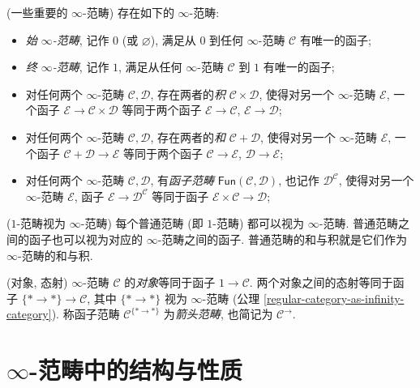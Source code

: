 \begin{axiom}
	{(一些重要的 $\infty$-范畴)}
	存在如下的 $\infty$-范畴:
	\begin{itemize}
		\item \emph{始 $\infty$-范畴}, 记作 $0$ (或 $\varnothing$), 满足从 $0$ 到任何 $\infty$-范畴 $\mathcal C$ 有唯一的函子;
		\item \emph{终 $\infty$-范畴}, 记作 $1$, 满足从任何 $\infty$-范畴 $\mathcal C$ 到 $1$ 有唯一的函子;
		\item 对任何两个 $\infty$-范畴 $\mathcal C,\mathcal D$, 存在两者的\emph{积} $\mathcal C\times \mathcal D$,
		使得对另一个 $\infty$-范畴 $\mathcal E$,
		一个函子 $\mathcal E\to\mathcal C\times\mathcal D$ 等同于两个函子 $\mathcal E\to\mathcal C$, $\mathcal E\to\mathcal D$;
		\item 对任何两个 $\infty$-范畴 $\mathcal C,\mathcal D$, 存在两者的\emph{和} $\mathcal C + \mathcal D$,
		使得对另一个 $\infty$-范畴 $\mathcal E$,
		一个函子 $\mathcal C + \mathcal D \to \mathcal E$ 等同于两个函子 $\mathcal C \to \mathcal E$, $\mathcal D \to \mathcal E$;
		\item 对任何两个 $\infty$-范畴 $\mathcal C,\mathcal D$, 有\emph{函子范畴} $\mathsf {Fun}(\mathcal C,\mathcal D)$,
		也记作 $\mathcal D^{\mathcal C}$, 使得对另一个 $\infty$-范畴 $\mathcal E$,
		函子 $\mathcal E\to \mathcal D^{\mathcal C}$ 等同于函子 $\mathcal E\times\mathcal C \to \mathcal D$;
	\end{itemize}
\end{axiom}

\begin{axiom}
	[label={regular-category-as-infinity-category}]
	{($1$-范畴视为 $\infty$-范畴)}
	每个普通范畴 (即 $1$-范畴) 都可以视为 $\infty$-范畴. 普通范畴之间的函子也可以视为对应的 $\infty$-范畴之间的函子.
	普通范畴的和与积就是它们作为 $\infty$-范畴的和与积.
\end{axiom}

\begin{axiom}
	{(对象, 态射)}
	$\infty$-范畴 $\mathcal C$ 的\emph{对象}等同于函子 $1\to \mathcal C$.
	两个对象之间的态射等同于函子 $\{*\to *\}\to \mathcal C$, 其中 $\{*\to *\}$ 视为 $\infty$-范畴 (公理 \ref{regular-category-as-infinity-category}).
	称函子范畴 $\mathcal C^{\{*\to *\}}$ 为\emph{箭头范畴}, 也简记为 $\mathcal C^\rightarrow$.
\end{axiom}

\section{$\infty$-范畴中的结构与性质}

